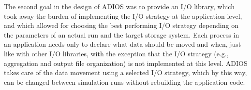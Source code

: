The second goal in the design of ADIOS was to provide an I/O library, which took away the burden of implementing the I/O strategy at the application level, and which allowed for choosing the best performing I/O strategy depending on the parameters of an actual run and the target storage system. Each process in an application needs only to declare what data should be moved and when, just like with other I/O libraries, with the exception that the I/O strategy (e.g., aggregation and output file organization) is not implemented at this level. ADIOS takes care of the data movement using a selected I/O strategy, which by this way, can be changed between simulation runs without rebuilding the application code. 

